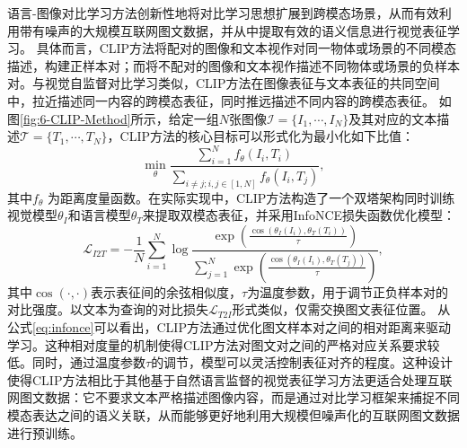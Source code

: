 语言-图像对比学习方法创新性地将对比学习思想扩展到跨模态场景，从而有效利用带有噪声的大规模互联网图文数据，并从中提取有效的语义信息进行视觉表征学习。
具体而言，CLIP方法将配对的图像和文本视作对同一物体或场景的不同模态描述，构建正样本对；而将不配对的图像和文本视作描述不同物体或场景的负样本对。与视觉自监督对比学习类似，CLIP方法在图像表征与文本表征的共同空间中，拉近描述同一内容的跨模态表征，同时推远描述不同内容的跨模态表征。
如图\ref{fig:6-CLIP-Method}所示，给定一组$N$张图像$\mathcal{I}=\{I_1,\cdots,I_N\}$及其对应的文本描述$\mathcal{T}=\{T_1,\cdots,T_N\}$，CLIP方法的核心目标可以形式化为最小化如下比值：
\begin{equation}
    \min_{\theta}\frac{\sum_{i=1}^{N}f_{\theta}(I_i,T_i)}{\sum_{i\neq j;i,j\in[1,N]}f_{\theta}(I_i,T_j)},
    \label{eq:instance-level}
\end{equation}
其中$f_{\theta}$ 为距离度量函数。在实际实现中，CLIP方法构造了一个双塔架构同时训练视觉模型$\theta_I$和语言模型$\theta_T$来提取双模态表征，并采用InfoNCE损失函数\cite{oord2018representation}优化模型：
\begin{equation}
 \mathcal{L}_{I2T}=-\frac{1}{N} \sum_{i=1}^{N} \log \frac{\exp \left(\frac{\cos \left(\theta_I(I_{i}), \theta_T(T_{i})\right)}{\tau}\right)}{\sum_{j=1}^{N} \exp \left(\frac{\cos \left(\theta_I(I_{i}), \theta_T(T_{j})\right)}{\tau}\right)},
 \label{eq:infonce}
\end{equation}
其中$\cos(\cdot, \cdot)$表示表征间的余弦相似度，$\tau$为温度参数，用于调节正负样本对的对比强度。以文本为查询的对比损失$\mathcal{L}_{T2I}$形式类似，仅需交换图文表征位置。
从公式\eqref{eq:infonce}可以看出，CLIP方法通过优化图文样本对之间的相对距离来驱动学习。这种相对度量的机制使得CLIP方法对图文对之间的严格对应关系要求较低。同时，通过温度参数$\tau$的调节，模型可以灵活控制表征对齐的程度。这种设计使得CLIP方法相比于其他基于自然语言监督的视觉表征学习方法更适合处理互联网图文数据：它不要求文本严格描述图像内容，而是通过对比学习框架来捕捉不同模态表达之间的语义关联，从而能够更好地利用大规模但噪声化的互联网图文数据进行预训练。

